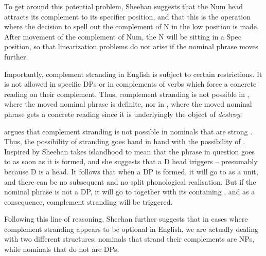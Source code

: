 \documentclass[output=paper]{LSP/langsci}
\begin{document}
To get around this potential problem, Sheehan suggests that the Num head attracts its complement to its specifier position, and that this is the operation where the decision to spell out the complement of N in the low position is made. After movement of the complement of Num, the N will be sitting in a Spec position, so that linearization problems do not arise if the nominal phrase moves further.

Importantly, complement stranding in English is subject to certain restrictions. It is not allowed in specific DPs or in complements of verbs which {force} a concrete reading on their complement. Thus, complement stranding is not possible in , where the moved nominal phrase is definite, nor in , where the moved nominal phrase gets a concrete reading since it is underlyingly the object of \textit{destroy}:

\ea%
    \label{ex:julien:20}
\z
\z

\ea%
    \label{ex:julien:21}
\z
\z

\citet{Sheehan2009} argues that complement stranding is not possible in nominals that are strong . Thus, the possibility of stranding goes hand in hand with the possibility of . Inspired by \citet{Uriagereka1999}
Sheehan takes islandhood to mean that the phrase in {question} goes to  as soon as it is formed, and she suggests that a D head triggers  – presumably because D is a  head. It follows that when a DP is formed, it will go to  as a unit, and there can be no subsequent  and no split phonological realisation. But if the nominal phrase is not a DP, it will go to  together with its containing , and as a consequence, complement stranding will be triggered.


Following this line of reasoning, Sheehan further suggests that in cases where complement stranding appears to be optional in English, we are actually dealing with two different structures: nominals that strand their complements are NPs, while nominals that do not are DPs.
\end{document}
